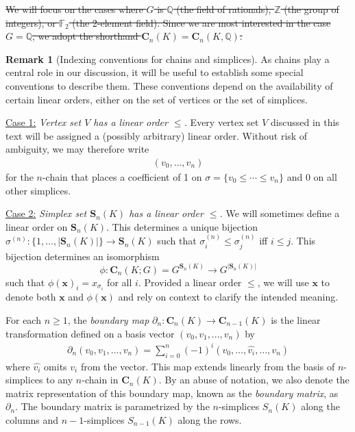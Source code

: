 \documentclass[utf8]{formatting_stuff/frontiersFPHY}
\newcommand{\Z}{\mathbb{Z}}
\newcommand{\Q}{\mathbb{Q}}
\newcommand{\field}{\mathbb{F}}
\newcommand{\Chains}{\mathbf{C}}
\newcommand{\Simplices}[0]{\mathbf{S}}
\newcommand{\optimalrep}{\mathbf{x}}
\newcommand{\orepentry}{x}
\newcommand{\dimss}[1]{^{(#1)}}
\theoremstyle{plain}
\theoremstyle{definition}
\newtheorem{remark}[theorem]{Remark}
\providecommand{\DIFdeltex}[1]{{\protect\color{red}\sout{#1}}}
\providecommand{\DIFdelbegin}{} %
\providecommand{\DIFdelend}{} %
\providecommand{\DIFdel}[1]{\texorpdfstring{\DIFdeltex{#1}}{}} %
\begin{document}
\DIFdelbegin  
\DIFdel{We will focus on the cases where $G$ is $\Q$ (the field of rationals), $\Z$ (the group of integers), or $\field_2$ (the 2-element field).  Since we are most interested in the case $G = \Q$, we adopt the shorthand $\Chains_n(K) = \Chains_n(K,\mathbb{Q})$. 
} 
\DIFdelend \begin{remark}[{Indexing conventions for chains and simplices}]
\label{rmk:indexingchains}
As chains play a central role in our discussion, it will be useful to establish some special conventions to describe them.  These conventions depend on the availability of certain linear orders, either on the set of vertices or the set of simplices.

\noindent \underline{Case 1:} \emph{Vertex set $V$ has a linear order $\le$. }  Every vertex set $V$ discussed in this text will be assigned a (possibly arbitrary) linear order.  Without  risk of ambiguity, we may therefore write
    \begin{align*}
        (v_0, \ldots, v_n)
    \end{align*}
for the $n$-chain that places a coefficient of 1 on $\sigma = \{v_0 \leq \cdots \leq v_n\}$ and 0 on all other simplices. 

\noindent \underline{Case 2:} \emph{Simplex set $\Simplices_n(K)$ has a linear order $\le$.}  We will sometimes define a linear order on $\Simplices_n(K)$.  This determines a unique bijection  $\sigma \dimss{n}: \{1, \ldots, |\Simplices_n(K)|\} \to  \Simplices_n(K)$ such that $\sigma_i\dimss{n} \le \sigma_j\dimss{n}$ iff $i \le j$.  This bijection determines an isomorphism
    $$
        \phi: 
        \Chains_n(K;G) = G^{\Simplices_n(K)}
        \to
        G^{|\Simplices_n(K)|}
    $$
such that $\phi(\optimalrep)_i = \orepentry_{\sigma_i}$ for all $i$.  
Provided a linear order $\le$,  we will use $\optimalrep$ to denote both $\optimalrep$ and $\phi(\optimalrep)$ and rely on context to clarify the  intended meaning.
\end{remark}


  

For each $n\geq 1$, the \textit{boundary map} $\partial_n: \Chains_n(K) \rightarrow \Chains_{n-1}(K)$ is the linear transformation defined on a basis vector  $(v_0, v_1, \ldots, v_n)$ by 
    \begin{align*}
    \textstyle
        \partial_n(v_0, v_1, \ldots, v_n) = \sum_{i=0}^n (-1)^i (v_0, \ldots, \hat{v_i}, \ldots, v_n)
    \end{align*}
where $\hat{v_i}$ omits $v_i$ from the vector. This map extends linearly from the basis of $n$-simplices to any $n$-chain in $\Chains_n(K)$. By an abuse of notation, we also denote the matrix representation of this boundary map, known as the \textit{boundary matrix}, as $\partial_n$. The boundary matrix is parametrized by the $n$-simplices $S_n(K)$ along the columns and $n-1$-simplices $S_{n-1}(K)$ along the rows. 
\end{document}
